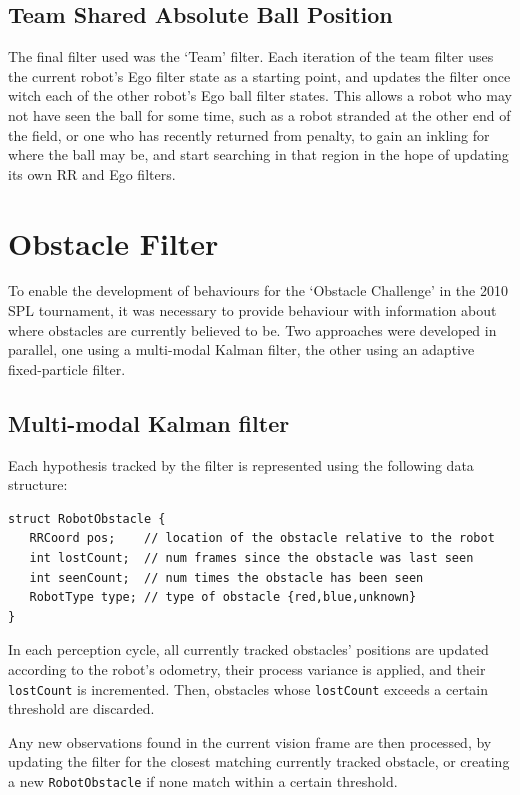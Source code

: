 \documentclass[pdftex,11pt,a4paper]{report}
\begin{document}
\subsection{Team Shared Absolute Ball Position}

The final filter used was the `Team' filter. Each iteration of the team filter uses the current robot's Ego filter state as a starting point, and updates the filter once witch each of the other robot's Ego ball filter states. This allows a robot who may not have seen the ball for some time, such as a robot stranded at the other end of the field, or one who has recently returned from penalty, to gain an inkling for where the ball may be, and start searching in that region in the hope of updating its own RR and Ego filters.

\section{Obstacle Filter}

To enable the development of behaviours for the `Obstacle Challenge' in the 2010 SPL tournament, it was necessary to provide behaviour with information about where obstacles are currently believed to be. Two approaches were developed in parallel, one using a multi-modal Kalman filter, the other using an adaptive fixed-particle filter.

\subsection{Multi-modal Kalman filter}

Each hypothesis tracked by the filter is represented using the following data structure:

\begin{lstlisting}
struct RobotObstacle {
   RRCoord pos;    // location of the obstacle relative to the robot
   int lostCount;  // num frames since the obstacle was last seen
   int seenCount;  // num times the obstacle has been seen
   RobotType type; // type of obstacle {red,blue,unknown}
}
\end{lstlisting}

In each perception cycle, all currently tracked obstacles' positions are updated according to the robot's odometry, their process variance is applied, and their {\tt lostCount} is incremented. Then, obstacles whose {\tt lostCount} exceeds a certain threshold are discarded.

Any new observations found in the current vision frame are then processed, by updating the filter for the closest matching currently tracked obstacle, or creating a new {\tt RobotObstacle} if none match within a certain threshold.
\end{document}
